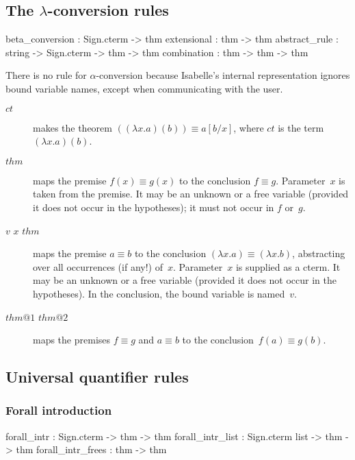 \subsection{The $\lambda$-conversion rules}
\begin{ttbox} 
beta_conversion : Sign.cterm -> thm
extensional     : thm -> thm
abstract_rule   : string -> Sign.cterm -> thm -> thm
combination     : thm -> thm -> thm
\end{ttbox} 
There is no rule for $\alpha$-conversion because Isabelle's internal
representation ignores bound variable names, except when communicating with
the user.
\begin{description}
\item[ $ct$] 
makes the theorem $((\lambda x.a)(b)) \equiv a[b/x]$, where $ct$ is the
term $(\lambda x.a)(b)$.

\item[ $thm$] 
maps the premise $f(x) \equiv g(x)$ to the conclusion $f\equiv g$.
Parameter~$x$ is taken from the premise.  It may be an unknown or a free
variable (provided it does not occur in the hypotheses); it must not occur
in $f$ or~$g$.

\item[ $v$ $x$ $thm$] 
maps the premise $a\equiv b$ to the conclusion $(\lambda x.a) \equiv
(\lambda x.b)$, abstracting over all occurrences (if any!) of~$x$.
Parameter~$x$ is supplied as a cterm.  It may be an unknown or a free
variable (provided it does not occur in the hypotheses).  In the
conclusion, the bound variable is named~$v$.

\item[ $thm@1$ $thm@2$] 
maps the premises $f\equiv g$ and $a\equiv b$ to the conclusion~$f(a)\equiv
g(b)$.
\end{description}


\subsection{Universal quantifier rules}
\subsubsection{Forall introduction}
\begin{ttbox} 
forall_intr       : Sign.cterm      -> thm -> thm
forall_intr_list  : Sign.cterm list -> thm -> thm
forall_intr_frees :                    thm -> thm
\end{ttbox}

